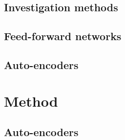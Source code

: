 

\subsection{Investigation methods}



\subsection{Feed-forward networks}








\subsection{Auto-encoders}





\section{Method}




\subsection{Auto-encoders}


